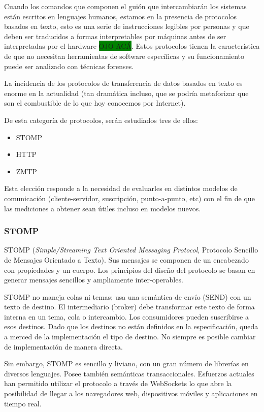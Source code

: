 Cuando los comandos que componen el guión que intercambiarán los sistemas están escritos en lenguajes humanos, estamos en la presencia de protocolos basados en texto, esto es una serie de instrucciones legibles por personas y que deben ser traducidos a formas interpretables por máquinas antes de ser interpretadas por el hardware \colorbox{green}{OJO ACÁ}. Estos protocolos tienen la característica de que no necesitan herramientas de software específicas y su funcionamiento puede ser analizado con técnicas forenses.

La incidencia de los protocolos de transferencia de datos basados en texto es enorme en la actualidad (tan dramática incluso, que se podría metaforizar que son el combustible de lo que hoy conocemos por Internet).

De esta categoría de protocolos, serán estudiados tres de ellos:

\begin{itemize}
  \item STOMP
  \item HTTP
  \item ZMTP
\end{itemize}

Esta elección responde a la necesidad de evaluarles en distintos modelos de comunicación (cliente-servidor, suscripción, punto-a-punto, etc) con el fin de que las mediciones a obtener sean útiles incluso en modelos nuevos.

\subsubsection{STOMP}


STOMP (\textit{Simple/Streaming Text Oriented Messaging Protocol}, Protocolo Sencillo de Mensajes Orientado a Texto). Sus mensajes se componen de un encabezado con propiedades y un cuerpo. Los principios del diseño del protocolo se basan en generar mensajes sencillos y ampliamente inter-operables.

STOMP no maneja colas ni temas; usa una semántica de envío (SEND) con un texto de destino. El intermediario (broker) debe transformar este texto de forma interna en un tema, cola o intercambio. Los consumidores pueden suscribirse a esos destinos. Dado que los destinos no están definidos en la especificación, queda a merced de la implementación el tipo de destino. No siempre es posible cambiar de implementación de manera directa.

Sin embargo, STOMP es sencillo y liviano, con un gran número de librerías en diversos lenguajes. Posee también semánticas transaccionales. Esfuerzos actuales han permitido utilizar el protocolo a través de WebSockets lo que abre la posibilidad de llegar a los navegadores web, dispositivos móviles y aplicaciones en tiempo real.

